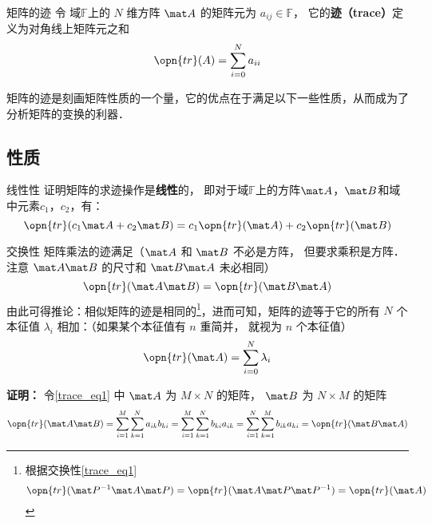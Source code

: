 

\begin{definition}{矩阵的迹}
令 域$\mathbb{F}$上的 $N$ 维方阵 $\mat A$ 的矩阵元为 $a_{ij}\in\mathbb{F}$， 它的\textbf{迹（trace）}定义为对角线上矩阵元之和
\begin{equation}
\opn{tr}(A) = \sum_{i=0}^N a_{ii}
\end{equation}
\end{definition}

矩阵的迹是刻画矩阵性质的一个量，它的优点在于满足以下一些性质，从而成为了分析矩阵的变换的利器．


\subsection{性质}


\begin{exercise}{线性性}
证明矩阵的求迹操作是\textbf{线性}的， 即对于域$\mathbb{F}$上的方阵$\mat A$，$\mat B$和域中元素$c_1$，$c_2$，有：
\begin{equation}
\opn{tr}(c_1\mat A+c_2\mat B) = c_1\opn{tr}(\mat A) + c_2\opn{tr}(\mat B)
\end{equation}
\end{exercise}

\begin{example}{交换性}
矩阵乘法的迹满足（$\mat A$ 和 $\mat B$ 不必是方阵， 但要求乘积是方阵． 注意 $\mat A\mat B$ 的尺寸和 $\mat B\mat A$ 未必相同）
\begin{equation}\label{trace_eq1}
\opn{tr}(\mat A\mat B) = \opn{tr}(\mat B\mat A)
\end{equation}
由此可得推论：相似矩阵的迹是相同的\footnote{根据交换性\autoref{trace_eq1} $$\opn{tr}(\mat P^{-1}\mat A\mat P) = \opn{tr}(\mat A\mat P\mat P^{-1}) = \opn{tr}(\mat A)$$}，进而可知，矩阵的迹等于它的所有 $N$ 个本征值 $\lambda_i$ 相加：（如果某个本征值有 $n$ 重简并， 就视为 $n$ 个本征值）
\begin{equation}
\opn{tr}(\mat A) = \sum_{i=0}^N \lambda_i
\end{equation}
\end{example}

\textbf{证明：}
令\autoref{trace_eq1} 中 $\mat A$ 为 $M\times N$ 的矩阵， $\mat B$ 为 $N\times M$ 的矩阵
\begin{equation}
\opn{tr}(\mat A\mat B) = \sum_{i=1}^M \sum_{k=1}^N a_{ik}b_{ki} = \sum_{i=1}^M \sum_{k=1}^N b_{ki}a_{ik} = \sum_{i=1}^N \sum_{k=1}^M b_{ik}a_{ki} = \opn{tr}(\mat B\mat A)
\end{equation}

